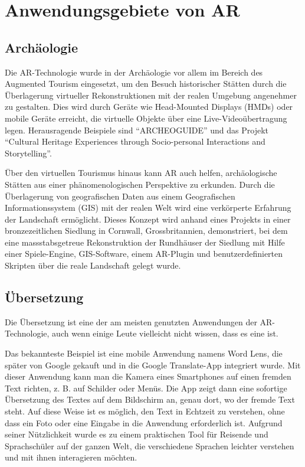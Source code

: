 
\section{Anwendungsgebiete von AR}

\subsection{Archäologie}

Die AR-Technologie wurde in der Archäologie vor allem im Bereich des Augmented Tourism eingesetzt, um den Besuch historischer Stätten durch die Überlagerung virtueller Rekonstruktionen mit der realen Umgebung angenehmer zu gestalten. Dies wird durch Geräte wie Head-Mounted Displays (HMDs) oder mobile Geräte erreicht, die virtuelle Objekte über eine Live-Videoübertragung legen. Herausragende Beispiele sind “ARCHEOGUIDE” und das Projekt “Cultural Heritage Experiences through Socio-personal Interactions and Storytelling”. 

Über den virtuellen Tourismus hinaus kann AR auch helfen, archäologische Stätten aus einer phänomenologischen Perspektive zu erkunden. Durch die Überlagerung von geografischen Daten aus einem Geografischen Informationssystem (GIS) mit der realen Welt wird eine verkörperte Erfahrung der Landschaft ermöglicht. Dieses Konzept wird anhand eines Projekts in einer bronzezeitlichen Siedlung in Cornwall, Grossbritannien, demonstriert, bei dem eine massstabsgetreue Rekonstruktion der Rundhäuser der Siedlung mit Hilfe einer Spiele-Engine, GIS-Software, einem AR-Plugin und benutzerdefinierten Skripten über die reale Landschaft gelegt wurde. 
\cite{Archaeology}

\subsection{Übersetzung}

Die Übersetzung ist eine der am meisten genutzten Anwendungen der AR-Technologie, auch wenn einige Leute vielleicht nicht wissen, dass es eine ist. 

Das bekannteste Beispiel ist eine mobile Anwendung namens Word Lens, die später von Google gekauft und in die Google Translate-App integriert wurde. Mit dieser Anwendung kann man die Kamera eines Smartphones auf einen fremden Text richten, z. B. auf Schilder oder Menüs. Die App zeigt dann eine sofortige Übersetzung des Textes auf dem Bildschirm an, genau dort, wo der fremde Text steht. Auf diese Weise ist es möglich, den Text in Echtzeit zu verstehen, ohne dass ein Foto oder eine Eingabe in die Anwendung erforderlich ist. Aufgrund seiner Nützlichkeit wurde es zu einem praktischen Tool für Reisende und Sprachschüler auf der ganzen Welt, die verschiedene Sprachen leichter verstehen und mit ihnen interagieren möchten. \cite{QuestVisual_2010}


